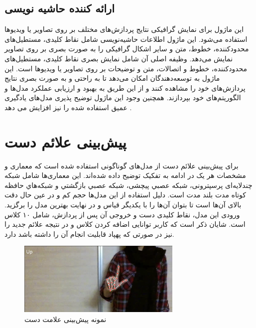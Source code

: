 \subsection{ارائه کننده حاشیه نویسی\protect{}}
این ماژول برای نمایش گرافیکی نتایج پردازش‌های مختلف بر روی تصاویر یا ویدیوها استفاده می‌شود. این ماژول اطلاعات حاشیه‌نویسی شامل نقاط کلیدی، مستطیل‌های محدودکننده، خطوط، متن و سایر اشکال گرافیکی را به صورت 
بصری بر روی تصاویر نمایش می‌دهد. وظیفه اصلی آن شامل نمایش بصری نقاط کلیدی، مستطیل‌های محدودکننده، خطوط و اتصالات، متن و توضیحات بر روی تصاویر یا ویدیوها است. این ماژول به توسعه‌دهندگان امکان 
می‌دهد تا به راحتی و به صورت بصری نتایج پردازش‌های خود را مشاهده کنند و از این طریق به بهبود و ارزیابی عملکرد مدل‌ها و الگوریتم‌های خود بپردازند.
همچنین وجود این ماژول توضیح پذیری مدل‌های یادگیری عمیق استفاده شده را نیز افزایش می دهد
\cite{zhang2020mediapipe}.

\section{پیش‌بینی علائم دست}
برای پیش‌بینی علائم دست از مدل‌های گوناگونی استفاده شده است که معماری و مشخصات هر یک در ادامه به تفکیک توضیح داده‌ شده‌اند. این معماری‌ها شامل شبكه چندلایه‌ای پرسپترونی، شبكه عصبي پیچشی، شبكه عصبي بازگشتي و شبكه‌هاي حافظه كوتاه مدت بلند مدت است. دلیل استفاده از این مدل‌ها حجم کم و در عین حال دقت بالای آن‌ها است تا بتوان آن‌ها را با یکدیگر قیاس و در نهایت بهترین مدل را برگزید. 
ورودی این مدل، نقاط کلیدی دست و خروجی آن پس از پردازش، شامل ۱۰ کلاس است. شایان ذکر است که کاربر توانایی اضافه کردن کلاس و در نتیجه علائم جدید را نیز در صورتی که پهپاد قابلیت انجام آن را داشته باشد دارد.


\begin{figure}[h]
    \centering
    \includegraphics[width=0.7\textwidth]{gesture_UP.png}
    \caption {نمونه پیش‌بینی علامت دست}
\end{figure}






